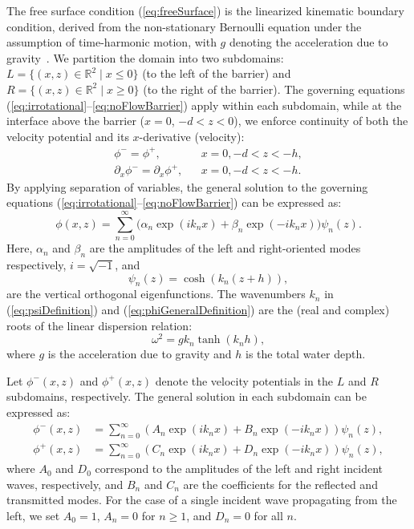 \documentclass[a4paper,12pt]{report}
\begin{document}
The free surface condition (\ref{eq:freeSurface}) is the linearized kinematic boundary condition, derived from the non-stationary Bernoulli equation under the assumption of time-harmonic motion, with $g$ denoting the acceleration due to gravity~\cite{alma9938079562602711}. We partition the domain into two subdomains: $L = \{(x, z) \in \mathbb{R}^2 \mid x \leq 0\}$ (to the left of the barrier) and $R = \{(x, z) \in \mathbb{R}^2 \mid x \geq 0\}$ (to the right of the barrier). The governing equations (\ref{eq:irrotational}--\ref{eq:noFlowBarrier}) apply within each subdomain, while at the interface above the barrier ($x=0$, $-d < z < 0$), we enforce continuity of both the velocity potential and its $x$-derivative (velocity):
\begin{align}
\label{eq:phiEquality}
\phi^- = \phi^+, &&  x=0, -d < z < -h,\\
\label{eq:phiPartialEquality}
\partial_x\phi^- = \partial_x\phi^+, &&  x=0, -d < z < -h.
\end{align}
By applying separation of variables, the general solution to the governing equations (\ref{eq:irrotational}--\ref{eq:noFlowBarrier}) can be expressed as:
\begin{equation}
\label{eq:phiGeneralDefinition}
\phi(x,z) = \sum_{n=0}^{\infty} \big(\alpha_n\exp(ik_nx) + \beta_n\exp(-ik_nx)\big)\psi_n(z).
\end{equation}
Here, $\alpha_n$ and $\beta_n$ are the amplitudes of the left and right-oriented modes respectively, $i = \sqrt{-1}$, and
\begin{equation}
\label{eq:psiDefinition}
    \psi_n(z) = \cosh(k_n(z+h)),
\end{equation}
are the vertical orthogonal eigenfunctions. The wavenumbers $k_n$ in (\ref{eq:psiDefinition}) and (\ref{eq:phiGeneralDefinition}) are the (real and complex) roots of the linear dispersion relation:
\begin{equation}
\label{eq:waveNumbers}
\omega^2 = gk_n \tanh(k_n h),
\end{equation}
where $g$ is the acceleration due to gravity and $h$ is the total water depth.

Let $\phi^-(x,z)$ and $\phi^+(x,z)$ denote the velocity potentials in the $L$ and $R$ subdomains, respectively. The general solution in each subdomain can be expressed as:
\begin{align}
\label{eq:phiMinusDefinition}
\phi^-(x,z) &= \sum_{n=0}^{\infty} \left(A_n \exp(ik_n x) + B_n\exp(-ik_n x)\right)\psi_n(z),\\
\label{eq:phiPlusDefinition}
\phi^+(x,z) &= \sum_{n=0}^{\infty} \left(C_n\exp(ik_n x)+ D_n\exp(-ik_n x)\right)\psi_n(z),
\end{align}
where $A_0$ and $D_0$ correspond to the amplitudes of the left and right incident waves, respectively, and $B_n$ and $C_n$ are the coefficients for the reflected and transmitted modes. For the case of a single incident wave propagating from the left, we set $A_0 = 1$, $A_n = 0$ for $n \geq 1$, and $D_n = 0$ for all $n$. 
\end{document}
